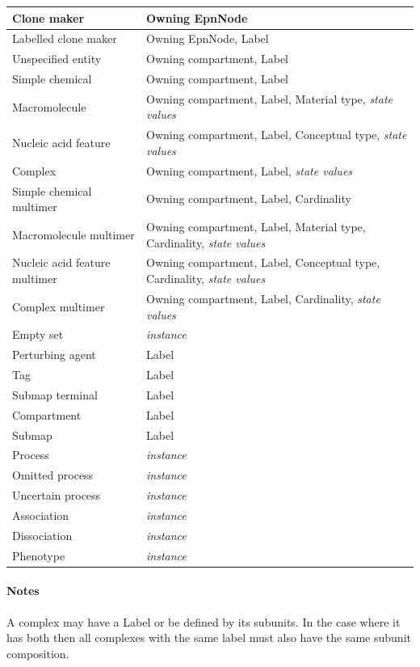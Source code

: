 \begin{center}
\begin{small}
\begin{supertabular}{|p{4.5cm}|p{10cm}|}
Clone maker & Owning EpnNode \\\hline
Labelled clone maker & Owning EpnNode, Label \\\hline
Unspecified entity & Owning compartment, Label \\\hline
Simple chemical & Owning compartment, Label \\\hline
Macromolecule & Owning compartment, Label, Material type, \emph{state values} \\\hline
Nucleic acid feature & Owning compartment, Label, Conceptual type, \emph{state values} \\\hline
Complex & Owning compartment, Label,  \emph{state values} \\\hline
Simple chemical multimer & Owning compartment, Label, Cardinality \\\hline
Macromolecule multimer & Owning compartment, Label, Material type, Cardinality, \emph{state values} \\\hline
Nucleic acid feature multimer & Owning compartment, Label, Conceptual type, Cardinality, \emph{state values} \\\hline
Complex multimer & Owning compartment, Label, Cardinality,  \emph{state values} \\\hline
Empty set & \emph{instance} \\\hline
Perturbing agent & Label \\\hline
Tag & Label \\\hline
Submap terminal & Label \\\hline
Compartment & Label \\\hline
Submap & Label \\\hline
Process & \emph{instance} \\\hline
Omitted process & \emph{instance} \\\hline
Uncertain process & \emph{instance} \\\hline
Association & \emph{instance} \\\hline
Dissociation & \emph{instance} \\\hline
Phenotype & \emph{instance} \\\hline
\end{supertabular}
\end{small}
\end{center}


\paragraph*{Notes}

A complex may have a Label or be defined by its subunits. In the case where it has both then all complexes with the same label must also have the same subunit composition.




